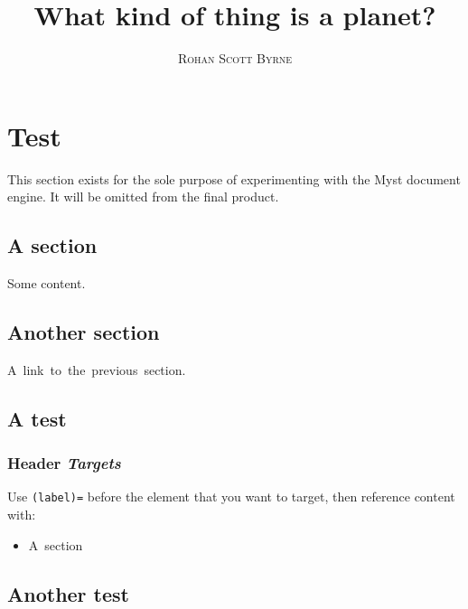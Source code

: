 \documentclass[a4paper,11pt,oneside]{book}
\title{\Huge \textbf{What kind of thing is a planet?}}
\author{\textsc{Rohan Scott Byrne}}
\begin{document}
\sloppy

\renewcommand{\thesection}{\arabic{section}}  %

\frontmatter
\maketitle

\tableofcontents

\mainmatter

% 
% 

\cite{Sarma2008-wu}

\section{Test}

This section exists for the sole purpose of experimenting with the Myst document engine. It will be omitted from the final product.

\subsection{A section}\label{my-section}

Some content.

\subsection{Another section}

A~link~to~the~previous~section.

\subsection{A test}

\subsubsection{Header \textit{Targets}}\label{my-section}

Use \texttt{(label)=} before the element that you want to target, then reference content with:

\begin{itemize}
\item A~section
\end{itemize}

\subsection{Another test}
\end{document}
